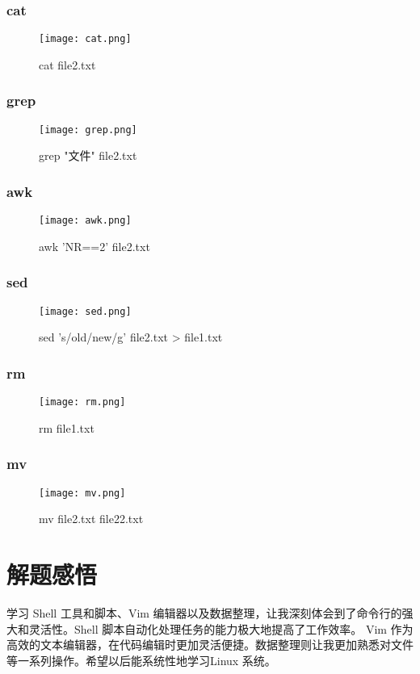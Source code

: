 \documentclass{ctexart}
\begin{document}
\subsubsection{cat}
\begin{figure}[h]
    \centering
    \texttt{[image: cat.png]}
    \caption{cat file2.txt}
    \label{fig:enter-label}
\end{figure}

\subsubsection{grep}
\begin{figure}[h]
    \centering
    \texttt{[image: grep.png]}
    \caption{grep "文件" file2.txt}
    \label{fig:enter-label}
\end{figure}

\subsubsection{awk}
\begin{figure}[h]
    \centering
    \texttt{[image: awk.png]}
    \caption{awk 'NR==2' file2.txt}
    \label{fig:enter-label}
\end{figure}


\subsubsection{sed}
\begin{figure}[h]
    \centering
    \texttt{[image: sed.png]}
    \caption{sed 's/old/new/g' file2.txt > file1.txt}
    \label{fig:enter-label}
\end{figure}

\subsubsection{rm}
\begin{figure}[H]
    \centering
    \texttt{[image: rm.png]}
    \caption{rm file1.txt}
    \label{fig:enter-label}
\end{figure}

\subsubsection{mv}
\begin{figure}[H]
    \centering
    \texttt{[image: mv.png]}
    \caption{mv file2.txt file22.txt}
    \label{fig:enter-label}
\end{figure}


\section{解题感悟}
学习 Shell 工具和脚本、Vim 编辑器以及数据整理，让我深刻体会到了命令行的强大和灵活性。Shell 脚本自动化处理任务的能力极大地提高了工作效率。 Vim 作为高效的文本编辑器，在代码编辑时更加灵活便捷。数据整理则让我更加熟悉对文件等一系列操作。希望以后能系统性地学习Linux 系统。
\end{document}
